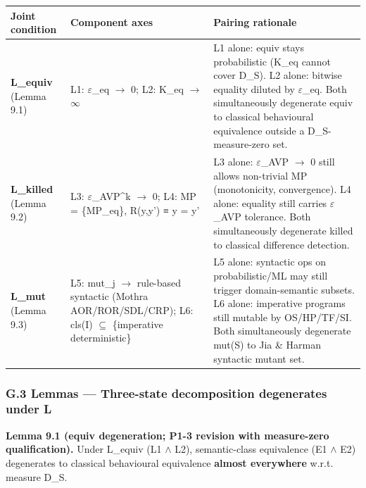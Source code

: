 \documentclass[review,12pt,authoryear]{elsarticle}
\newcounter{none}                   %
\begin{document}
{\def\LTcaptype{none} %
\begin{longtable}[]{@{}
  >{\raggedright\arraybackslash}p{}
  >{\raggedright\arraybackslash}p{}
  >{\raggedright\arraybackslash}p{}@{}}
\toprule\noalign{}
\begin{minipage}[b]{\linewidth}\raggedright
Joint condition
\end{minipage} & \begin{minipage}[b]{\linewidth}\raggedright
Component axes
\end{minipage} & \begin{minipage}[b]{\linewidth}\raggedright
Pairing rationale
\end{minipage} \\
\midrule\noalign{}
\endhead
\bottomrule\noalign{}
\endlastfoot
\textbf{L\_equiv} (Lemma 9.1) & L1: $\varepsilon$\_eq $\to$ 0; L2: K\_eq $\to$ $\infty$ & L1 alone:
equiv stays probabilistic (K\_eq cannot cover D\_S). L2 alone: bitwise
equality diluted by $\varepsilon$\_eq. Both simultaneously degenerate equiv to
classical behavioural equivalence outside a D\_S-measure-zero set. \\
\textbf{L\_killed} (Lemma 9.2) & L3: $\varepsilon$\_AVP\^{}k $\to$ 0; L4: MP =
\{MP\_eq\}, R(y,y') ≡ y = y' & L3 alone: $\varepsilon$\_AVP $\to$ 0 still allows
non-trivial MP (monotonicity, convergence). L4 alone: equality still
carries $\varepsilon$\_AVP tolerance. Both simultaneously degenerate killed to
classical difference detection. \\
\textbf{L\_mut} (Lemma 9.3) & L5: mut\_j $\to$ rule-based syntactic (Mothra
AOR/ROR/SDL/CRP); L6: cls(I) $\subseteq$ \{imperative deterministic\} & L5 alone:
syntactic ops on probabilistic/ML may still trigger domain-semantic
subsets. L6 alone: imperative programs still mutable by OS/HP/TF/SI.
Both simultaneously degenerate mut(S) to Jia \& Harman syntactic mutant
set. \\
\end{longtable}
}

\subsubsection{G.3 Lemmas --- Three-state decomposition degenerates
under L}\label{g.3-lemmas-three-state-decomposition-degenerates-under-l}

\textbf{Lemma 9.1 (equiv degeneration; P1-3 revision with measure-zero
qualification).} Under L\_equiv (L1 $\wedge$ L2), semantic-class equivalence
(E1 $\wedge$ E2) degenerates to classical behavioural equivalence
\textbf{almost everywhere} w.r.t. measure D\_S.
\end{document}
